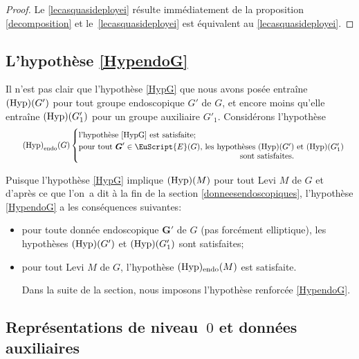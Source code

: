\documentclass[JEP,XML,SOM,Unicode,francais]{cedram}
\let\mathcal \EuScript
\newcommand{\rendo}{\mathrm{endo}}
\newcommand{\Hyp}{\textup{Hyp}}
\newcommand{\bG}{\boldsymbol{G}}
\newcommand{\cE}{\mathcal{E}}
\theoremstyle{plain}
\theoremstyle{definition}
\begin{document}
\begin{proof}
Le \eqref{lecasquasideployei} résulte immédiatement de la proposition \ref{decomposition} et le~\eqref{lecasquasideployei} est équivalent au \eqref{lecasquasideployei}.
\end{proof}

\subsection{L'hypothèse \texorpdfstring{\ref{HypendoG}}{Hyp}}\label{Hypendo}

Il n'est pas clair que l'hypothèse \ref{HypG} que nous avons posée entraîne $(\Hyp)(G')$ pour tout groupe endoscopique $G'$ de $G$, et encore moins qu'elle entraîne $(\Hyp)(G'_{1})$ pour un groupe auxiliaire $G'_{1}$. Considérons l'hypothèse\vspace*{-6pt}
\begin{equation}\tag*{$\textup{(Hyp)}_\rendo(G)$}\label{HypendoG} \begin{cases}
\text{l'hypothèse \ref{HypG} est satisfaite;}\\
\text{pour tout $\bG'\in \cE(G)$, les hypothèses $(\Hyp)(G')$ et $(\Hyp)(G'_{1})$}\\[-3pt]
\hspace*{7cm}\text{sont satisfaites.}
\end{cases}
\end{equation}

Puisque l'hypothèse \ref{HypG} implique $(\Hyp)(M)$ pour tout Levi $M$ de $G$ et d'après ce que l'on~a dit à la fin de la section \ref{donneesendoscopiques}, l'hypothèse \ref{HypendoG} a les conséquences suivantes:
\begin{itemize}
\item
pour toute donnée endoscopique $\bG'$ de $G$ (pas forcément elliptique), les hypothèses $(\Hyp)(G')$ et $(\Hyp)(G'_{1})$ sont satisfaites;

\item
pour tout Levi $M$ de $G$, l'hypothèse $(\Hyp)_{\rendo}(M)$ est satisfaite.

\smallskip
\noindent
Dans la suite de la section, nous imposons l'hypothèse renforcée \ref{HypendoG}.
\end{itemize}


\subsection{Représentations de niveau~\texorpdfstring{$0$}{0} et données auxiliaires}\label{representationsetdonnees}
\end{document}
